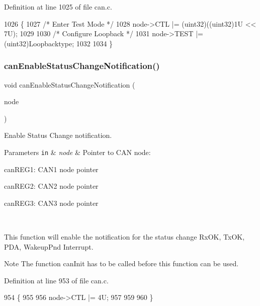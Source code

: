 Definition at line 1025 of file can.\+c.


\begin{DoxyCode}
1026 \{
1027     \textcolor{comment}{/* Enter Test Mode */}
1028     node->CTL |= (uint32)((uint32)1U << 7U);
1029     
1030     \textcolor{comment}{/* Configure Loopback */}
1031     node->TEST |= (uint32)Loopbacktype;
1032     
1034 \}
\end{DoxyCode}
\mbox{\label{group__CAN_ga0acd0f1c9a17f321a40754a93f2d8696}} 
\subsubsection{\texorpdfstring{can\+Enable\+Status\+Change\+Notification()}{canEnableStatusChangeNotification()}}
{\footnotesize\ttfamily void can\+Enable\+Status\+Change\+Notification (\begin{DoxyParamCaption}\item[{\mbox{\hyperlink{reg__can_8h_a54ace0879c28a425474845a63d662c05}{can\+B\+A\+S\+E\+\_\+t}} $\ast$}]{node }\end{DoxyParamCaption})}



Enable Status Change notification. 


\begin{DoxyParams}[1]{Parameters}
\mbox{\tt in}  & {\em node} & Pointer to C\+AN node\+:
\begin{DoxyItemize}
\item can\+R\+E\+G1\+: C\+A\+N1 node pointer
\item can\+R\+E\+G2\+: C\+A\+N2 node pointer
\item can\+R\+E\+G3\+: C\+A\+N3 node pointer
\end{DoxyItemize}\\
\hline
\end{DoxyParams}
This function will enable the notification for the status change Rx\+OK, Tx\+OK, P\+DA, Wakeup\+Pnd Interrupt. \begin{DoxyNote}{Note}
The function can\+Init has to be called before this function can be used. 
\end{DoxyNote}


Definition at line 953 of file can.\+c.


\begin{DoxyCode}
954 \{
955 
956     node->CTL |= 4U;
957 
959 
960 \}
\end{DoxyCode}
\mbox{\label{group__CAN_gab54b99b32b9402b55b845029f9118b77}} 
